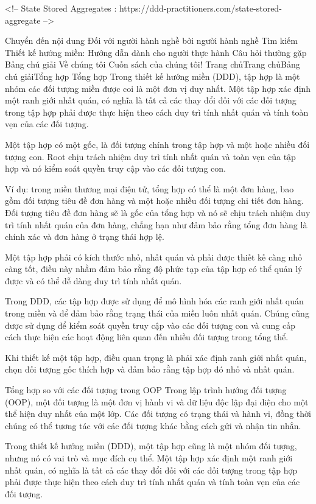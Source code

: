 <!-- State Stored Aggregates : https://ddd-practitioners.com/state-stored-aggregate -->



Chuyển đến nội dung
Đối với người hành nghề bởi người hành nghề
Tìm kiếm
Thiết kế hướng miền: Hướng dẫn dành cho người thực hành
Câu hỏi thường gặp
Bảng chú giải
Về chúng tôi
Cuốn sách của chúng tôi!
Trang chủTrang chủBảng chú giảiTổng hợp
Tổng hợp
Trong thiết kế hướng miền (DDD), tập hợp là một nhóm các đối tượng miền được coi là một đơn vị duy nhất. Một tập hợp xác định một ranh giới nhất quán, có nghĩa là tất cả các thay đổi đối với các đối tượng trong tập hợp phải được thực hiện theo cách duy trì tính nhất quán và tính toàn vẹn của các đối tượng.

Một tập hợp có một gốc, là đối tượng chính trong tập hợp và một hoặc nhiều đối tượng con. Root chịu trách nhiệm duy trì tính nhất quán và toàn vẹn của tập hợp và nó kiểm soát quyền truy cập vào các đối tượng con.

Ví dụ: trong miền thương mại điện tử, tổng hợp có thể là một đơn hàng, bao gồm đối tượng tiêu đề đơn hàng và một hoặc nhiều đối tượng chi tiết đơn hàng. Đối tượng tiêu đề đơn hàng sẽ là gốc của tổng hợp và nó sẽ chịu trách nhiệm duy trì tính nhất quán của đơn hàng, chẳng hạn như đảm bảo rằng tổng đơn hàng là chính xác và đơn hàng ở trạng thái hợp lệ.

Một tập hợp phải có kích thước nhỏ, nhất quán và phải được thiết kế càng nhỏ càng tốt, điều này nhằm đảm bảo rằng độ phức tạp của tập hợp có thể quản lý được và có thể dễ dàng duy trì tính nhất quán.

Trong DDD, các tập hợp được sử dụng để mô hình hóa các ranh giới nhất quán trong miền và để đảm bảo rằng trạng thái của miền luôn nhất quán. Chúng cũng được sử dụng để kiểm soát quyền truy cập vào các đối tượng con và cung cấp cách thực hiện các hoạt động liên quan đến nhiều đối tượng trong tổng thể.

Khi thiết kế một tập hợp, điều quan trọng là phải xác định ranh giới nhất quán, chọn đối tượng gốc thích hợp và đảm bảo rằng tập hợp đó nhỏ và nhất quán.

Tổng hợp so với các đối tượng trong OOP
Trong lập trình hướng đối tượng (OOP), một đối tượng là một đơn vị hành vi và dữ liệu độc lập đại diện cho một thể hiện duy nhất của một lớp. Các đối tượng có trạng thái và hành vi, đồng thời chúng có thể tương tác với các đối tượng khác bằng cách gửi và nhận tin nhắn.

Trong thiết kế hướng miền (DDD), một tập hợp cũng là một nhóm đối tượng, nhưng nó có vai trò và mục đích cụ thể. Một tập hợp xác định một ranh giới nhất quán, có nghĩa là tất cả các thay đổi đối với các đối tượng trong tập hợp phải được thực hiện theo cách duy trì tính nhất quán và tính toàn vẹn của các đối tượng.


